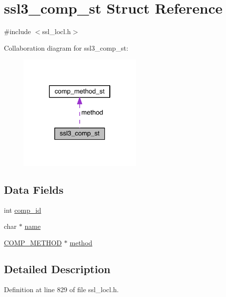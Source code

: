 \hypertarget{structssl3__comp__st}{}\section{ssl3\+\_\+comp\+\_\+st Struct Reference}
\label{structssl3__comp__st}


{\ttfamily \#include $<$ssl\+\_\+locl.\+h$>$}



Collaboration diagram for ssl3\+\_\+comp\+\_\+st\+:\nopagebreak
\begin{figure}[H]
\begin{center}
\leavevmode
\includegraphics[width=173pt]{structssl3__comp__st__coll__graph}
\end{center}
\end{figure}
\subsection*{Data Fields}
\begin{DoxyCompactItemize}
\item 
int \hyperlink{structssl3__comp__st_af43d634bfe573ddfbc79db2baa15409f}{comp\+\_\+id}
\item 
char $\ast$ \hyperlink{structssl3__comp__st_a5ac083a645d964373f022d03df4849c8}{name}
\item 
\hyperlink{crypto_2ossl__typ_8h_a9f90390c950298b1f28bfd30c93234ef}{C\+O\+M\+P\+\_\+\+M\+E\+T\+H\+OD} $\ast$ \hyperlink{structssl3__comp__st_a07809985d67be99453d6b52cfc6b57e1}{method}
\end{DoxyCompactItemize}


\subsection{Detailed Description}


Definition at line 829 of file ssl\+\_\+locl.\+h.



